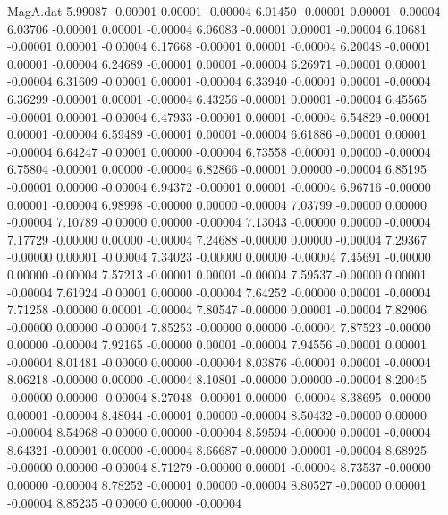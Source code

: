 \begin{filecontents}{MagA.dat}
   5.99087   -0.00001    0.00001   -0.00004
   6.01450   -0.00001    0.00001   -0.00004
   6.03706   -0.00001    0.00001   -0.00004
   6.06083   -0.00001    0.00001   -0.00004
   6.10681   -0.00001    0.00001   -0.00004
   6.17668   -0.00001    0.00001   -0.00004
   6.20048   -0.00001    0.00001   -0.00004
   6.24689   -0.00001    0.00001   -0.00004
   6.26971   -0.00001    0.00001   -0.00004
   6.31609   -0.00001    0.00001   -0.00004
   6.33940   -0.00001    0.00001   -0.00004
   6.36299   -0.00001    0.00001   -0.00004
   6.43256   -0.00001    0.00001   -0.00004
   6.45565   -0.00001    0.00001   -0.00004
   6.47933   -0.00001    0.00001   -0.00004
   6.54829   -0.00001    0.00001   -0.00004
   6.59489   -0.00001    0.00001   -0.00004
   6.61886   -0.00001    0.00001   -0.00004
   6.64247   -0.00001    0.00000   -0.00004
   6.73558   -0.00001    0.00000   -0.00004
   6.75804   -0.00001    0.00000   -0.00004
   6.82866   -0.00001    0.00000   -0.00004
   6.85195   -0.00001    0.00000   -0.00004
   6.94372   -0.00001    0.00001   -0.00004
   6.96716   -0.00000    0.00001   -0.00004
   6.98998   -0.00000    0.00000   -0.00004
   7.03799   -0.00000    0.00000   -0.00004
   7.10789   -0.00000    0.00000   -0.00004
   7.13043   -0.00000    0.00000   -0.00004
   7.17729   -0.00000    0.00000   -0.00004
   7.24688   -0.00000    0.00000   -0.00004
   7.29367   -0.00000    0.00001   -0.00004
   7.34023   -0.00000    0.00000   -0.00004
   7.45691   -0.00000    0.00000   -0.00004
   7.57213   -0.00001    0.00001   -0.00004
   7.59537   -0.00000    0.00001   -0.00004
   7.61924   -0.00001    0.00000   -0.00004
   7.64252   -0.00000    0.00001   -0.00004
   7.71258   -0.00000    0.00001   -0.00004
   7.80547   -0.00000    0.00001   -0.00004
   7.82906   -0.00000    0.00000   -0.00004
   7.85253   -0.00000    0.00000   -0.00004
   7.87523   -0.00000    0.00000   -0.00004
   7.92165   -0.00000    0.00001   -0.00004
   7.94556   -0.00001    0.00001   -0.00004
   8.01481   -0.00000    0.00000   -0.00004
   8.03876   -0.00001    0.00001   -0.00004
   8.06218   -0.00000    0.00000   -0.00004
   8.10801   -0.00000    0.00000   -0.00004
   8.20045   -0.00000    0.00000   -0.00004
   8.27048   -0.00001    0.00000   -0.00004
   8.38695   -0.00000    0.00001   -0.00004
   8.48044   -0.00001    0.00000   -0.00004
   8.50432   -0.00000    0.00000   -0.00004
   8.54968   -0.00000    0.00000   -0.00004
   8.59594   -0.00000    0.00001   -0.00004
   8.64321   -0.00001    0.00000   -0.00004
   8.66687   -0.00000    0.00001   -0.00004
   8.68925   -0.00000    0.00000   -0.00004
   8.71279   -0.00000    0.00001   -0.00004
   8.73537   -0.00000    0.00000   -0.00004
   8.78252   -0.00001    0.00000   -0.00004
   8.80527   -0.00000    0.00001   -0.00004
   8.85235   -0.00000    0.00000   -0.00004
\end{filecontents}
